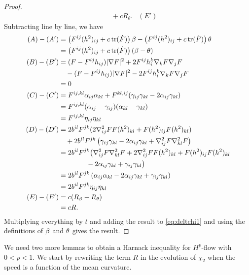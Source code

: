 \documentclass{amsart}
\begin{document}
\begin{proof}
\begin{align*}
&\quad + cR_{\theta}. & (E')
\end{align*}
Subtracting line by line, we have
\begin{align*}
(A) - (A') &= \left(F^{ij}(h^2)_{ij} + c\operatorname{tr}(\dot{F}) \right)\beta - \left(F^{ij}(h^2)_{ij} + c\operatorname{tr}(\dot{F}) \right)\theta \\
        &= \left(F^{ij}(h^2)_{ij} + c\operatorname{tr}(\dot{F}) \right)(\beta - \theta) \\
(B) - (B') &= (F - F^{ij}h_{ij}) |\nabla F|^{2} + 2F^{ij}h^{k}_{i}\nabla_k F \nabla_j F \\ 
    &\quad - (F - F^{ij}h_{ij})|\nabla F|^{2} - 2F^{ij}h^{k}_{i}\nabla_kF\nabla_jF \\    
        &= 0 \\
(C) - (C') &= F^{ij,kl} \alpha_{ij} \alpha_{kl} + F^{kl,ij} (\gamma_{ij}\gamma_{kl}  - 2\alpha_{ij} \gamma_{kl})\\ 
    &= F^{ij,kl} (\alpha_{ij} - \gamma_{ij}) (\alpha_{kl} - \gamma_{kl}) \\
&= F^{ij,kl} \eta_{ij} \eta_{kl} \\
(D) - (D') &= 2b^{il}F^{jk} (2\nabla^2_{ij}FF(h^2)_{kl} + F(h^2)_{ij}F(h^2)_{kl}) \\
&\quad + 2b^{il} F^{jk} \left(\gamma_{ij} \gamma_{kl} - 2\alpha_{ij} \gamma_{kl} + \nabla^2_{ij}F\nabla^2_{kl}F\right) \\
&= 2b^{il}F^{jk} \big(\nabla^2_{ij}F\nabla^2_{kl}F +2\nabla^2_{ij}FF(h^2)_{kl} + F(h^2)_{ij}F(h^2)_{kl} \\
    &\qquad\qquad - 2 \alpha_{ij} \gamma_{kl} + \gamma_{ij} \gamma_{kl} \big) \\
&= 2b^{il}F^{jk} \left(\alpha_{ij}\alpha_{kl} - 2 \alpha_{ij} \gamma_{kl} + \gamma_{ij} \gamma_{kl} \right) \\ 
    &= 2b^{il}F^{jk} \eta_{ij} \eta_{kl} \\
(E) - (E') &= c(R_{\beta} - R_{\theta}) \\ 
    &= cR.\\
\end{align*}
Multiplying everything by \(t\) and adding the result to \cref{eq:deltchi1} and using the definitions of $\beta$ and $\theta$ gives the result.
\end{proof}
We need two more lemmas to obtain a Harnack inequality for $H^{p}$-flow with $0<p<1.$  We start by rewriting the term $R$ in the evolution of \(\chi_2\) when the speed is a function of the mean curvature.
\end{document}
